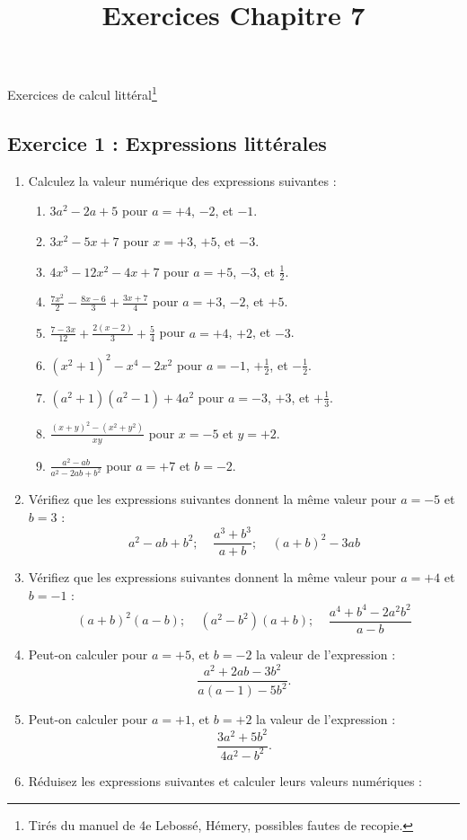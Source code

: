 \documentclass[12 pt]{extarticle}
\title{Exercices Chapitre 7}
\date{}
\theoremstyle{plain}
\begin{document}
\begin{center}{\Large Exercices de calcul littéral\footnote{Tirés du manuel de 4e Lebossé, Hémery, possibles fautes de recopie.}}\\
 \end{center} 
 
 \subsection*{Exercice 1 : Expressions littérales}
\begin{enumerate}
\item Calculez la valeur numérique des expressions suivantes : 
\begin{enumerate}
\item $3a^2-2a+5$ pour $a =  +4$, $-2$, et $-1$.
\item $3x^2-5x+7$ pour $x =  +3$, $+5$, et $-3$.
\item $4x^3-12x^2-4x+7$ pour $a =  +5$, $-3$, et $\frac12$.
\item $\frac{7x^2}2- \frac{8x-6}3 + \frac{3x+7}4$ pour $a =  +3$, $-2$, et $+5$.
\item $\frac{7-3x}{12}+\frac{2(x-2)}3 +\frac54$ pour $a =  +4$, $+2$, et $-3$.
\item $(x^2+1)^2 - x^4 -2x^2$ pour $a =  -1$, $+\frac12$, et $-\frac12$.
\item $(a^2+1)(a^2-1) + 4a^2$ pour $a =  -3$, $+3$, et $+\frac13$.
\item $\frac{(x+y)^2-(x^2+y^2)}{xy}$ pour $x=-5$ et $y=+2$.
\item $\frac{a^2-ab}{a^2-2ab+b^2}$ pour $a=+7$ et $b=-2$.
\end{enumerate}
\item Vérifiez que les expressions suivantes donnent la même valeur pour $a=-5$ et $b=3$ : 
\[ a^2 - ab + b^2; \ \ \ \ \ \frac{a^3+b^3}{a+b}; 
\ \ \ \ \ (a+b)^2-3ab\]
\item Vérifiez que les expressions suivantes donnent la même valeur pour $a=+4$ et $b=-1$ : 
\[ (a+b)^2(a-b); \ \ \ \ \ (a^2-b^2)(a+b); 
\ \ \ \ \ \frac{a^4+b^4-2a^2b^2}{a-b}\]
\item Peut-on calculer pour $a=+5$, et $b=-2$ la valeur de l'expression : \[ \frac{a^2+2ab-3b^2}{a(a-1)-5b^2}.\]
\item Peut-on calculer pour $a=+1$, et $b=+2$ la valeur de l'expression : \[ \frac{3a^2+5b^2}{4a^2-b^2}.\]
\item Réduisez les expressions suivantes et calculer leurs valeurs numériques :
\begin{enumerate}

\end{enumerate}
\end{enumerate}
\end{document}
